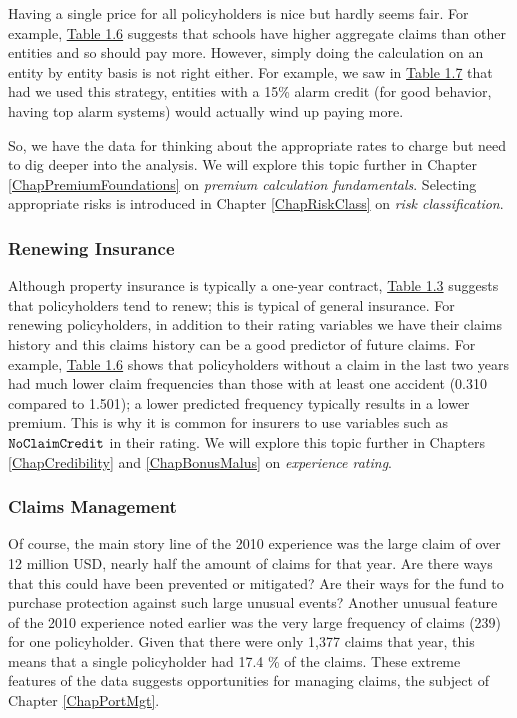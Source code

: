 \documentclass[
]{book}
\begin{document}
Having a single price for all policyholders is nice but hardly seems
fair. For example, \href{../docs/ChapIntro.html\#tab:1.6}{Table 1.6} suggests that schools have
higher aggregate claims than other entities and so should pay more. However,
simply doing the calculation on an entity by entity basis is not right
either. For example, we saw in \protect\hyperlink{tab:1.7}{Table 1.7} that had we
used this strategy, entities with a 15\% alarm credit (for good behavior,
having top alarm systems) would actually wind up paying more.

So, we have the data for thinking about the appropriate rates to charge
but need to dig deeper into the analysis. We will explore this
topic further in Chapter \ref{ChapPremiumFoundations} on \emph{premium calculation fundamentals}.
Selecting appropriate risks is introduced in Chapter \ref{ChapRiskClass} on \emph{risk
classification}.

\hypertarget{renewing-insurance-1}{%
\subsubsection*{Renewing Insurance}\label{renewing-insurance-1}}

Although property insurance is typically a one-year contract, \protect\hyperlink{tab:1.3}{Table 1.3} suggests that policyholders tend to renew; this is
typical of general insurance. For renewing policyholders, in addition to
their rating variables we have their claims history and this claims
history can be a good predictor of future claims. For example,
\href{../docs/ChapIntro.html\#tab:1.6}{Table 1.6} shows that policyholders without a claim in the last
two years had much lower claim frequencies than those with at least one
accident (0.310 compared to 1.501); a lower predicted frequency
typically results in a lower premium. This is why it is common for
insurers to use variables such as \({\tt NoClaimCredit}\) in their rating. We
will explore this topic further in Chapters \ref{ChapCredibility} and \ref{ChapBonusMalus} on \emph{experience rating}.

\hypertarget{claims-management}{%
\subsubsection*{Claims Management}\label{claims-management}}

Of course, the main story line of the 2010 experience was the large claim of
over 12 million USD, nearly half the amount of claims for that year. Are there
ways that this could have been prevented or mitigated? Are their ways
for the fund to purchase protection against such large unusual events?
Another unusual feature of the 2010 experience noted earlier was the
very large frequency of claims (239) for one policyholder. Given that
there were only 1,377 claims that year, this means that a single
policyholder had 17.4 \% of the claims. These extreme features of the data suggests
opportunities for managing claims, the subject of Chapter \ref{ChapPortMgt}.
\end{document}
